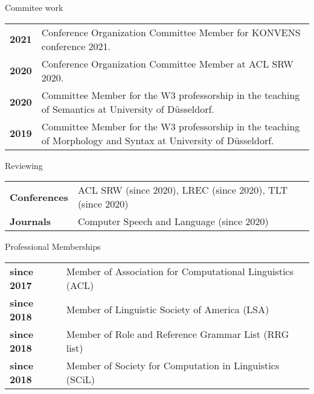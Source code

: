 \documentclass{resume} %
\begin{document}
\vspace{-10pt}

\begin{rSection}{Commitee work} 
	
\begin{tabular}{p{2cm}p{14cm}}
	{\bf 2021} & Conference Organization Committee Member for KONVENS conference 2021.\\
	{\bf 2020} & Conference Organization Committee Member at ACL SRW 2020.\\
	{\bf 2020} & Committee Member for the W3 professorship in the teaching of Semantics at University of D\"{u}sseldorf.\\
	{\bf 2019} & Committee Member for the W3 professorship in the teaching of Morphology and Syntax at University of D\"{u}sseldorf.
	
\end{tabular}
	
\end{rSection}

\vspace{-10pt}

\begin{rSection}{Reviewing} 
	
	\begin{tabular}{p{4cm}p{12cm}}
		{\bf Conferences } &  ACL SRW (since 2020), LREC (since 2020), TLT (since 2020) \\[5pt]
	{\bf Journals}	&  Computer Speech and Language (since 2020) \\[5pt]
		
	\end{tabular}
	
\end{rSection}

\begin{rSection}{Professional Memberships} 

\hspace{-20pt}
\begin{tabular}{p{3.8cm}p{13cm}}

{\bf since 2017} &  Member of Association for Computational Linguistics (ACL) \\[5pt]
{\bf since 2018} &  Member of Linguistic Society of America (LSA)\\[5pt]
{\bf since 2018} &  Member of Role and Reference Grammar List (RRG list) \\[5pt]
{\bf since 2018} &  Member of Society for Computation in Linguistics (SCiL) 

 
\end{tabular}

\end{rSection}
\end{document}
